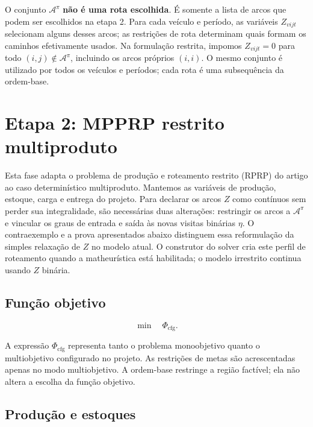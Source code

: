 \documentclass[11pt,a4paper]{article}
\newcommand{\A}{\mathcal{A}}
\begin{document}
O conjunto $\A^\pi$ \textbf{não é uma rota escolhida}. É somente a lista de arcos que podem ser escolhidos na etapa 2. Para cada veículo e período, as variáveis $Z_{vijt}$ selecionam alguns desses arcos; as restrições de rota determinam quais formam os caminhos efetivamente usados. Na formulação restrita, impomos $Z_{vijt}=0$ para todo $(i,j)\notin\A^\pi$, incluindo os arcos próprios $(i,i)$. O mesmo conjunto é utilizado por todos os veículos e períodos; cada rota é uma subsequência da ordem-base.

\section{Etapa 2: MPPRP restrito multiproduto}

Esta fase adapta o problema de produção e roteamento restrito (RPRP) do artigo ao caso determinístico multiproduto. Mantemos as variáveis de produção, estoque, carga e entrega do projeto. Para declarar os arcos $Z$ como contínuos sem perder sua integralidade, são necessárias duas alterações: restringir os arcos a $\A^\pi$ e vincular os graus de entrada e saída às novas visitas binárias $\eta$. O contraexemplo e a prova apresentados abaixo distinguem essa reformulação da simples relaxação de $Z$ no modelo atual. O construtor do solver cria este perfil de roteamento quando a matheurística está habilitada; o modelo irrestrito continua usando $Z$ binária.

\subsection{Função objetivo}

\begin{equation}
 \min\quad \Phi_{\mathrm{cfg}}.
 \label{eq:rprp-obj}
\end{equation}

A expressão $\Phi_{\mathrm{cfg}}$ representa tanto o problema monoobjetivo quanto o multiobjetivo configurado no projeto. As restrições de metas são acrescentadas apenas no modo multiobjetivo. A ordem-base restringe a região factível; ela não altera a escolha da função objetivo.

\subsection{Produção e estoques}
\end{document}
